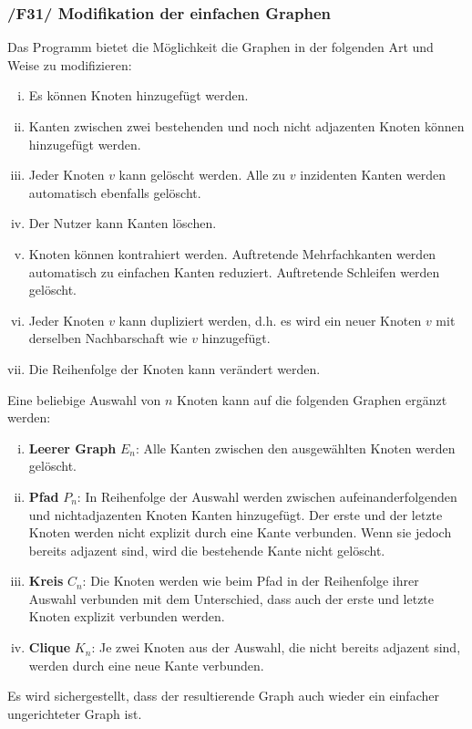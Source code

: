 \documentclass{article}
\begin{document}
	\subsubsection*{/F31/ Modifikation der einfachen Graphen} \label{f31} 
	Das Programm bietet die Möglichkeit die Graphen in der folgenden Art und Weise zu modifizieren:
	\begin{enumerate}[i)]
		\item{Es können Knoten hinzugefügt werden.}
		\item{Kanten zwischen zwei bestehenden und noch nicht adjazenten Knoten können hinzugefügt werden.}
		\item{Jeder Knoten $v$ kann gelöscht werden. Alle zu $v$ inzidenten Kanten werden automatisch ebenfalls gelöscht.}
		\item{Der Nutzer kann Kanten löschen.}
		\item{Knoten können kontrahiert werden. Auftretende Mehrfachkanten werden automatisch zu einfachen Kanten reduziert. Auftretende Schleifen werden gelöscht.}
		\item{Jeder Knoten $v$ kann dupliziert werden, d.h. es wird ein neuer Knoten $v$ mit derselben Nachbarschaft wie $v$ hinzugefügt.}
		\item{Die Reihenfolge der Knoten kann verändert werden.}
	\end{enumerate}
	
	Eine beliebige Auswahl von $n$ Knoten kann auf die folgenden Graphen ergänzt werden:
	\begin{enumerate}[i)]
		\item{\textbf{Leerer Graph} $E_n$: Alle Kanten zwischen den ausgewählten Knoten werden gelöscht.}
		\item{\textbf{Pfad} $P_n$: In Reihenfolge der Auswahl werden zwischen aufeinanderfolgenden und nichtadjazenten Knoten Kanten hinzugefügt. Der erste und der letzte Knoten werden nicht explizit durch eine Kante verbunden. Wenn sie jedoch bereits adjazent sind, wird die bestehende Kante nicht gelöscht.}
		\item{\textbf{Kreis} $C_n$: Die Knoten werden wie beim Pfad in der Reihenfolge ihrer Auswahl verbunden mit dem Unterschied, dass auch der erste und letzte Knoten explizit verbunden werden.}
		\item{\textbf{Clique} $K_n$: Je zwei Knoten aus der Auswahl, die nicht bereits adjazent sind, werden durch eine neue Kante verbunden.}
	\end{enumerate}
	Es wird sichergestellt, dass der resultierende Graph auch wieder ein einfacher ungerichteter Graph ist.
	
\end{document}
